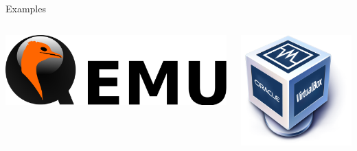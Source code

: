 \documentclass[11pt]{beamer}
\begin{document}
\begin{frame}{Examples}
\begin{columns}
  \end{columns}
  \begin{columns}
    \begin{column}{0.5\linewidth}
      \includegraphics[width=\linewidth]{qemu}
    \end{column}
    \begin{column}{0.5\linewidth}
      \begin{center}
        \includegraphics[width=0.7\linewidth]{virtualbox}
      \end{center}
    \end{column}
  \end{columns}
\end{frame}
\end{document}
